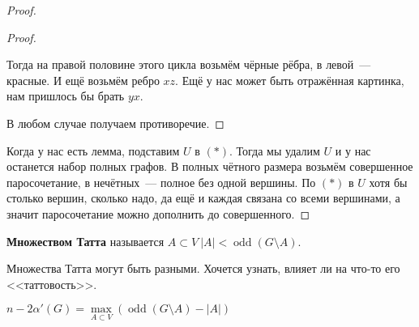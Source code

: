 \documentclass{article}
\begin{document}
\begin{proof}
\begin{proof}
\begin{enumerate}
\begin{figure}[H]
                \end{figure}
                Тогда на правой половине этого цикла возьмём чёрные рёбра, в левой~--- красные. И ещё возьмём ребро $xz$. Ещё у нас может быть отражённая картинка, нам пришлось бы брать $yx$.
            \end{enumerate}
            В любом случае получаем противоречие.
        \end{proof}
        Когда у нас есть лемма, подставим $U$ в $(*)$. Тогда мы удалим $U$ и у нас останется набор полных графов. В полных чётного размера возьмём совершенное паросочетание, в нечётных~--- полное без одной вершины. По $(*)$ в $U$ хотя бы столько вершин, сколько надо, да ещё и каждая связана со всеми вершинами, а значит паросочетание можно дополнить до совершенного.
    \end{proof}
    \begin{definition}
        \textbf{Множеством Татта} называется $A\subset V~|A|<\operatorname{odd}(G\setminus A)$.
    \end{definition}
    \begin{remark}
        Множества Татта могут быть разными. Хочется узнать, влияет ли на что-то его <<таттовость>>.
    \end{remark}
    \begin{theorem}
        $n-2\alpha'(G)=\max\limits_{A\subset V}(\operatorname{odd}(G\setminus A)-|A|)$
    \end{theorem}
\end{document}
